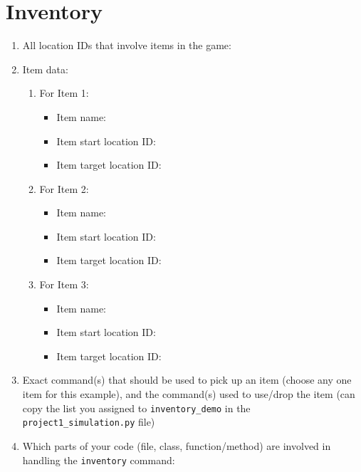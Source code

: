 \documentclass[11pt]{article}
\begin{document}

\section*{Inventory}

\begin{enumerate}
\item All location IDs that involve items in the game:

\item Item data:
\begin{enumerate}
    \item For Item 1:
    \begin{itemize}
    \item Item name:
    \item Item start location ID:
    \item Item target location ID:
    \end{itemize}
        \item For Item 2:
    \begin{itemize}
    \item Item name:
    \item Item start location ID:
    \item Item target location ID:
    \end{itemize}
        \item For Item 3:
    \begin{itemize}
    \item Item name:
    \item Item start location ID:
    \item Item target location ID:
    \end{itemize}
\end{enumerate}

    \item Exact command(s) that should be used to pick up an item (choose any one item for this example), and the command(s) used to use/drop the item (can copy the list you assigned to \texttt{inventory\_demo} in the \texttt{project1\_simulation.py} file)
    \item Which parts of your code (file, class, function/method) are involved in handling the \texttt{inventory} command:
\end{enumerate}
\end{document}
